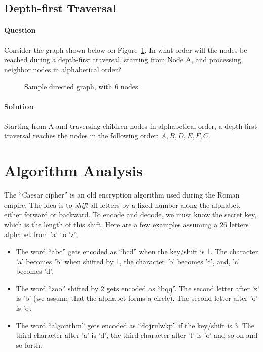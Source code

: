 \documentclass{article}
\begin{document}
\subsection{Depth-first Traversal}

\paragraph{Question} Consider the graph shown below on
Figure~\ref{fig:graph}. In what order will the nodes be reached during
a depth-first traversal, starting from Node A, and processing neighbor
nodes in alphabetical order?
\begin{figure}[htbp]
  \begin{center}
    
  \end{center}
  \caption{Sample directed graph, with 6 nodes.}
  \label{fig:graph}
\end{figure}

\paragraph{Solution} Starting from A and traversing children nodes in
alphabetical order, a depth-first traversal reaches the nodes in
the following order: $A, B, D, E, F, C$.


\section{Algorithm Analysis}

The ``Caesar cipher'' is an old encryption algorithm used during the
Roman empire. The idea is to \emph{shift} all letters by a fixed
number along the alphabet, either forward or backward. To encode and
decode, we must know the secret key, which is the length of this
shift. Here are a few examples assuming a 26 letters alphabet from 'a'
to 'z',

\begin{itemize}
\item The word ``abc'' gets encoded as ``bcd'' when the key/shift is
  1. The character 'a' becomes 'b' when shifted by 1, the character
  'b' becomes 'c', and, 'c' becomes 'd'.
\item The word ``zoo'' shifted by 2 gets encoded as ``bqq''. The
  second letter after 'z' is 'b' (we assume that the alphabet forms a
  circle). The second letter after 'o' is 'q'.
\item The word ``algorithm'' gets encoded as ``dojrulwkp'' if the
  key/shift is 3. The third character after 'a' is 'd', the third
  character after 'l' is 'o' and so on and so forth.
\end{itemize}
\end{document}
